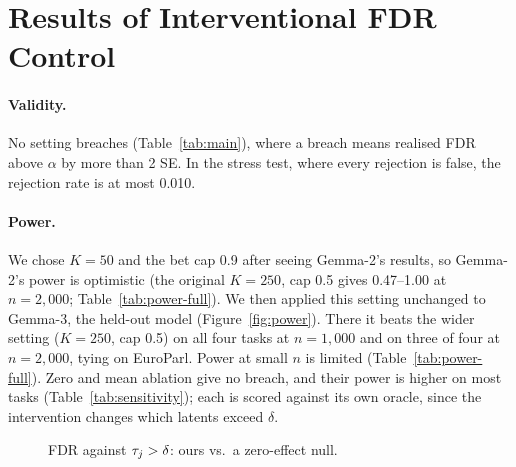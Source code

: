\section{Results of Interventional FDR Control}
\label{sec:results}

\paragraph{Validity.} No setting breaches (Table~\ref{tab:main}), where a breach means realised FDR above $\alpha$ by
more than 2 SE. In the stress test, where every rejection
is false, the rejection rate is at most 0.010.

\paragraph{Power.} We chose $K = 50$ and the bet cap 0.9 after seeing Gemma-2's results, so Gemma-2's power is
optimistic (the original $K = 250$, cap 0.5 gives 0.47--1.00 at $n = 2{,}000$; Table~\ref{tab:power-full}).
We then applied this setting unchanged to Gemma-3, the held-out model (Figure~\ref{fig:power}). There it beats the wider setting ($K = 250$, cap 0.5) on all four tasks at
$n = 1{,}000$ and on three of four at $n = 2{,}000$, tying on EuroParl. Power at small $n$ is limited (Table~\ref{tab:power-full}).
Zero and mean ablation give no breach, and their power is higher on most tasks (Table~\ref{tab:sensitivity}); each is scored against its own oracle, since the intervention changes which latents exceed $\delta$.

\begin{figure}[t]
\centering
\begin{minipage}[t]{0.4\textwidth}
\centering
{}
\caption{Effects of the 250 candidates per task relative to $\delta$.}
\label{fig:effects}
\end{minipage}\hspace{0.03\textwidth}
\begin{minipage}[t]{0.4\textwidth}
\centering
{}
\caption{FDR against $\tau_j > \delta$: ours vs.\ a zero-effect null.}
\label{fig:zeronull}
\end{minipage}
\end{figure}

